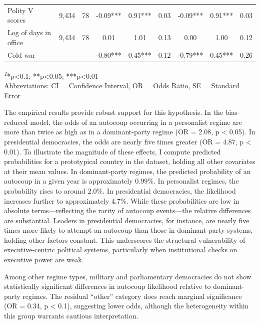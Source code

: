 \documentclass[
  12pt,
]{report}
\begin{document}
\begin{table}
{\begin{tabular*}{\linewidth}{@{\extracolsep{\fill}}lcccccccc}
Polity V scores & 9,434 & 78 & -0.09*** & 0.91*** & 0.03 & -0.09*** & 0.91*** & 0.03 \\ 
Log of days in office & 9,434 & 78 & 0.01 & 1.01 & 0.13 & 0.00 & 1.00 & 0.12 \\ 
Cold war &  &  & -0.80*** & 0.45*** & 0.12 & -0.79*** & 0.45*** & 0.26 \\ 
\bottomrule
\end{tabular*}
\begin{minipage}{\linewidth}
\textsuperscript{\textit{1}}*p\textless{}0.1; **p\textless{}0.05; ***p\textless{}0.01\\
Abbreviations: CI = Confidence Interval, OR = Odds Ratio, SE = Standard Error\\
\end{minipage}

}

\end{table}%

The empirical results provide robust support for this hypothesis. In the
bias-reduced model, the odds of an autocoup occurring in a personalist
regime are more than twice as high as in a dominant-party regime (OR =
2.08, p \textless{} 0.05). In presidential democracies, the odds are
nearly five times greater (OR = 4.87, p \textless{} 0.01). To illustrate
the magnitude of these effects, I compute predicted probabilities for a
prototypical country in the dataset, holding all other covariates at
their mean values. In dominant-party regimes, the predicted probability
of an autocoup in a given year is approximately \(0.99\%\). In
personalist regimes, the probability rises to around \(2.0\%\). In
presidential democracies, the likelihood increases further to
approximately \(4.7\%\). While these probabilities are low in absolute
terms---reflecting the rarity of autocoup events---the relative
differences are substantial. Leaders in presidential democracies, for
instance, are nearly five times more likely to attempt an autocoup than
those in dominant-party systems, holding other factors constant. This
underscores the structural vulnerability of executive-centric political
systems, particularly when institutional checks on executive power are
weak.

Among other regime types, military and parliamentary democracies do not
show statistically significant differences in autocoup likelihood
relative to dominant-party regimes. The residual ``other'' category does
reach marginal significance (OR = 0.34, p \textless{} 0.1), suggesting
lower odds, although the heterogeneity within this group warrants
cautious interpretation.
\end{document}
